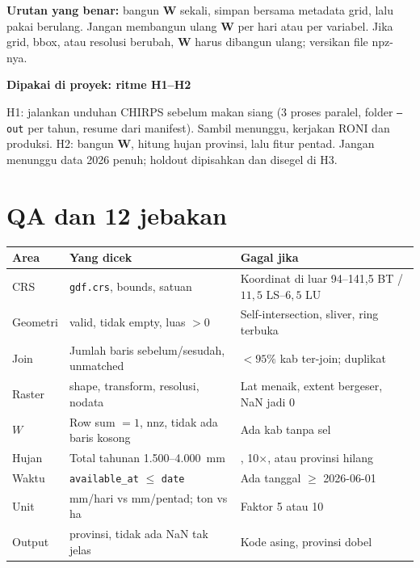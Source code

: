 \documentclass[9pt,a4paper]{extarticle}
\newcommand{\code}[1]{\texttt{\small\color{ink}#1}}
\newcommand{\thead}[1]{\textbf{\color{ink}#1}}
\newenvironment{projectbox}[1]
  {\begin{tcolorbox}[enhanced,breakable,colback=bg,colframe=bg,boxrule=0pt,arc=1.1mm,
    left=3mm,right=2.2mm,top=1.4mm,bottom=1.4mm,borderline west={2.2pt}{0pt}{ink},
    before skip=3pt,after skip=3pt]
   \textcolor{ink}{\sffamily\bfseries #1}\par\vspace{0.5pt}}
  {\end{tcolorbox}}
\begin{document}
\textbf{Urutan yang benar:} bangun $\mathbf{W}$ sekali, simpan bersama metadata grid, lalu pakai berulang. Jangan membangun ulang $\mathbf{W}$ per hari atau per variabel. Jika grid, bbox, atau resolusi berubah, $\mathbf{W}$ harus dibangun ulang; versikan file npz-nya.

\begin{projectbox}{Dipakai di proyek: ritme H1--H2}
H1: jalankan unduhan CHIRPS sebelum makan siang (3 proses paralel, folder \code{--out} per tahun, resume dari manifest). Sambil menunggu, kerjakan RONI dan produksi. H2: bangun $\mathbf{W}$, hitung hujan provinsi, lalu fitur pentad. Jangan menunggu data 2026 penuh; holdout dipisahkan dan disegel di H3.
\end{projectbox}

\section{QA dan 12 jebakan}

\begin{center}
\footnotesize
\begin{tabularx}{\linewidth}{@{}>{\RaggedRight\arraybackslash}p{2.2cm}>{\RaggedRight\arraybackslash}p{6.1cm}>{\RaggedRight\arraybackslash}X@{}}
\toprule
\rowcolor{bg}\thead{Area} & \thead{Yang dicek} & \thead{Gagal jika}\\
\midrule
CRS & \code{gdf.crs}, bounds, satuan & Koordinat di luar 94--141,5 BT / $11{,}5$ LS--$6{,}5$ LU\\
Geometri & valid, tidak empty, luas $>0$ & Self-intersection, sliver, ring terbuka\\
Join & Jumlah baris sebelum/sesudah, unmatched & $<95\%$ kab ter-join; duplikat\\
Raster & shape, transform, resolusi, nodata & Lat menaik, extent bergeser, NaN jadi 0\\
$W$ & Row sum $=1$, nnz, tidak ada baris kosong & Ada kab tanpa sel\\
Hujan & Total tahunan 1.500--4.000~mm & 0, 10$\times$, atau provinsi hilang\\
Waktu & \code{available\_at} $\le$ \code{date} & Ada tanggal $\ge$ 2026-06-01\\
Unit & mm/hari vs mm/pentad; ton vs ha & Faktor 5 atau 10\\
Output & 34 provinsi, tidak ada NaN tak jelas & Kode asing, provinsi dobel\\
\bottomrule
\end{tabularx}
\end{center}
\end{document}
